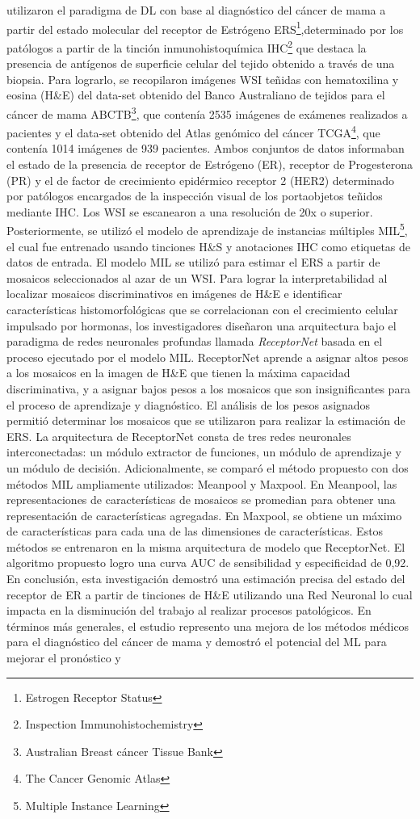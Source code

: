 \citep{Naik2020} utilizaron el paradigma de DL con base al diagnóstico del cáncer de mama a partir del estado molecular del receptor de Estrógeno ERS\footnote{Estrogen Receptor Status},determinado por los patólogos a partir de la tinción inmunohistoquímica IHC\footnote{Inspection Immunohistochemistry} que destaca la presencia de antígenos de superficie celular del tejido obtenido a través de una biopsia. Para lograrlo, se recopilaron imágenes WSI teñidas con hematoxilina y eosina (H\&E) del data-set obtenido del Banco Australiano de tejidos para el cáncer de mama ABCTB\footnote{Australian Breast cáncer Tissue Bank}, que contenía 2535 imágenes de exámenes realizados  a pacientes y el data-set obtenido del Atlas genómico del cáncer TCGA\footnote{The Cancer Genomic Atlas}, que contenía 1014 imágenes de 939 pacientes. Ambos conjuntos de datos informaban el estado de la presencia de receptor de Estrógeno (ER), receptor de Progesterona (PR) y el de factor de crecimiento epidérmico receptor 2 (HER2) determinado por patólogos encargados de la inspección visual de los portaobjetos teñidos mediante IHC. Los WSI se escanearon a una resolución de 20x o superior. Posteriormente, se utilizó el modelo de aprendizaje de instancias múltiples MIL\footnote{Multiple Instance Learning}, el cual fue entrenado usando tinciones H\&S y anotaciones IHC como etiquetas de datos de entrada. El modelo MIL se utilizó para estimar el ERS a partir de mosaicos seleccionados al azar de un WSI. Para lograr la interpretabilidad al localizar mosaicos discriminativos en imágenes de H\&E e identificar características histomorfológicas que se correlacionan con el crecimiento celular impulsado por hormonas, los investigadores diseñaron una arquitectura bajo el paradigma de redes neuronales profundas llamada \textit{ReceptorNet} basada en el proceso ejecutado por el modelo MIL. ReceptorNet aprende a asignar altos pesos a los mosaicos en la imagen de H\&E que tienen la máxima capacidad discriminativa, y a asignar bajos pesos a los mosaicos que son insignificantes para el proceso de aprendizaje y diagnóstico. El análisis de los pesos asignados permitió determinar los mosaicos que se utilizaron para realizar la estimación de ERS.  La arquitectura de ReceptorNet consta de tres redes neuronales interconectadas: un módulo extractor de funciones, un módulo de aprendizaje y un módulo de decisión. Adicionalmente, se comparó el método propuesto con dos métodos MIL ampliamente utilizados: Meanpool y Maxpool. En Meanpool, las representaciones de características de mosaicos se promedian para obtener una representación de características agregadas. En Maxpool, se obtiene un máximo de características para cada una de las dimensiones de características. Estos métodos se entrenaron en la misma arquitectura de modelo que ReceptorNet. El algoritmo propuesto logro una curva AUC de sensibilidad y especificidad de 0,92. En conclusión, esta investigación demostró una estimación precisa del estado del receptor de ER a partir de tinciones de H\&E utilizando una Red Neuronal lo cual impacta en la disminución del trabajo al realizar procesos patológicos. En términos más generales, el estudio represento una mejora de los métodos médicos para el diagnóstico del cáncer de mama y demostró el potencial del ML para mejorar el pronóstico y 